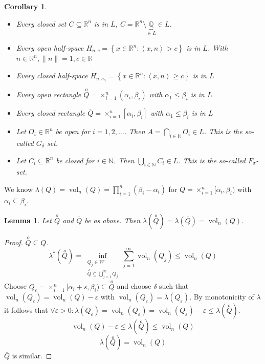 \documentclass{article}
\newtheorem{lemma}{Lemma}  \numberwithin{lemma}{section}
\newtheorem*{corollary}{Corollary}%
\newcommand{\set}[1]{\left\{#1\right\}}
\newcommand{\angel}[1]{\left\langle#1\right\rangle}
\DeclareMathOperator{\vol}{vol}  %
\begin{document}
\begin{corollary}
  \begin{itemize}
    \item Every closed set $C \subseteq \mathbb R^n$ is in $L$, $C = \mathbb R^n \setminus \underbrace{\mathbb Q}_{\in L} \in L$.
    \item Every open half-space $H_{n,c} = \set{x \in \mathbb R^n: \angel{x, n} > c}$ is in $L$.
      With $n \in \mathbb R^n, \|n\| = 1, c \in \mathbb R$
    \item Every closed half-space $\overline{H}_{n,c_n} = \set{x \in \mathbb R^n: \angel{x,n} \geq c}$ is in $L$
    \item Every open rectangle $\stackrel{o}{Q} = \times_{i=1}^n (\alpha_i, \beta_i)$ with $\alpha_1 \leq \beta_i$ is in $L$
    \item Every closed rectangle $\overline{Q} = \times_{i=1}^n [\alpha_i, \beta_i]$ with $\alpha_1 \leq \beta_i$ is in $L$
    \item Let $O_i \in \mathbb R^n$ be open for $i=1,2,\ldots$. Then $A = \bigcap_{i\in\mathbb N} O_i \in L$. This is the so-called $G_{\delta}$ set.
    \item Let $C_i \subseteq \mathbb R^n$ be closed for $i \in \mathbb N$. Then $\bigcup_{i \in \mathbb N} C_i \in L$. This is the so-called $F_{\sigma}$-set.
  \end{itemize}
\end{corollary}

We know $\lambda(Q) = \vol_n(Q) = \prod_{i=1}^n(\beta_i - \alpha_i)$ for $Q = \times_{i=1}^n [\alpha_i, \beta_i)$ with $\alpha_i \subseteq \beta_i$.

\begin{lemma}
  Let $\stackrel{o}{Q}$ and $\overline{Q}$ be as above. Then
  $\lambda(\stackrel{o}{Q}) = \lambda(\overline{Q}) = \vol_n(Q)$.
\end{lemma}
\begin{proof}
  $\stackrel{o}{Q} \subseteq Q$.
  \[ \lambda^*(\stackrel{o}{Q}) = \inf_{\substack{Q_j \in W \\ \stackrel{o}{Q} \subseteq \bigcup_{j=1}^\infty Q_j}} \sum_{j=1}^\infty \vol_n(Q_j) \leq \vol_n(Q) \]
  Choose $Q_{\varepsilon} = \times_{i=1}^n [\alpha_i + s, \beta_i) \subseteq \stackrel{o}{Q}$ and choose $\delta$ such that $\vol_n(Q_\varepsilon) = \vol_n(Q) - \varepsilon$ with $\vol_n(Q_\varepsilon) = \lambda(Q_\varepsilon)$.
  By monotonicity of $\lambda$ it follows that $\forall \varepsilon > 0: \lambda(Q_\varepsilon) = \vol_n(Q_\varepsilon) = \vol_n(Q_\varepsilon) - \varepsilon \leq \lambda(\stackrel{o}{Q})$.
  \[ \vol_n(Q) - \varepsilon \leq \lambda (\stackrel{o}{Q}) \leq \vol_n(Q) \]
  \[ \lambda(\stackrel{o}{Q}) = \vol_n(Q) \]
  $\overline{Q}$ is similar.
\end{proof}
\end{document}
